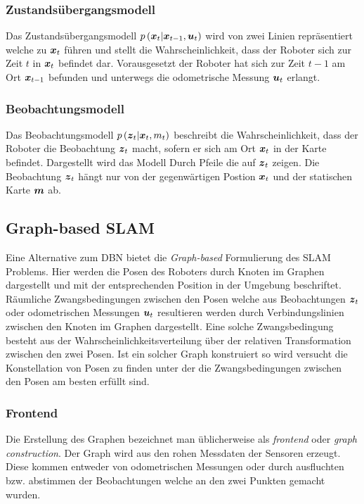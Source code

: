 \documentclass[12pt]{article}
\renewcommand*\vec[1]{{\mbox{\boldmath\ensuremath{#1}}}}
\begin{document}
\subsubsection{Zustandsübergangsmodell}
Das Zustandsübergangsmodell $p\left(\vec x_t |\vec x_{t-1}, \vec u_t\right)$ wird von zwei Linien repräsentiert welche zu $\vec x_t$ führen und
stellt die Wahrscheinlichkeit, dass der Roboter sich zur Zeit $t$ in $\vec x_t$ befindet dar. Vorausgesetzt der Roboter hat sich zur Zeit $t-1$ am
Ort $\vec x_{t-1}$ befunden und unterwegs die odometrische Messung $\vec u_t$ erlangt.

\subsubsection{Beobachtungsmodell}
Das Beobachtungsmodell $p\left(\vec z_t|\vec x_t, m_t\right)$ beschreibt die Wahrscheinlichkeit, dass der Roboter die Beobachtung $\vec z_t$
macht, sofern er sich am Ort $\vec x_t$ in der Karte befindet. Dargestellt wird das Modell Durch Pfeile die auf $\vec z_t$ zeigen. Die Beobachtung
$\vec z_t$ hängt nur von der gegenwärtigen Postion $\vec x_t$ und der statischen Karte $\vec m$ ab.

\subsection{Graph-based SLAM}
Eine Alternative zum DBN bietet die \textit{Graph-based} Formulierung des SLAM Problems. Hier werden die Posen des Roboters durch Knoten im Graphen
dargestellt und mit der entsprechenden Position in der Umgebung beschriftet. Räumliche Zwangsbedingungen zwischen den Posen welche aus Beobachtungen
$\vec z_t$ oder odometrischen Messungen $\vec u_t$ resultieren werden durch Verbindungslinien zwischen den Knoten im Graphen dargestellt. Eine solche
Zwangsbedingung besteht aus der Wahrscheinlichkeitsverteilung über der relativen Transformation zwischen den zwei Posen. Ist ein solcher Graph konstruiert
so wird versucht die Konstellation von Posen zu finden unter der die Zwangsbedingungen zwischen den Posen am besten erfüllt sind.

\subsubsection{Frontend}
Die Erstellung des Graphen bezeichnet man üblicherweise als \textit{frontend} oder \textit{graph construction}. Der Graph wird aus den rohen Messdaten
der Sensoren erzeugt.
Diese kommen entweder von odometrischen Messungen oder durch ausfluchten bzw. abstimmen der Beobachtungen welche an den zwei Punkten gemacht wurden.
\end{document}
